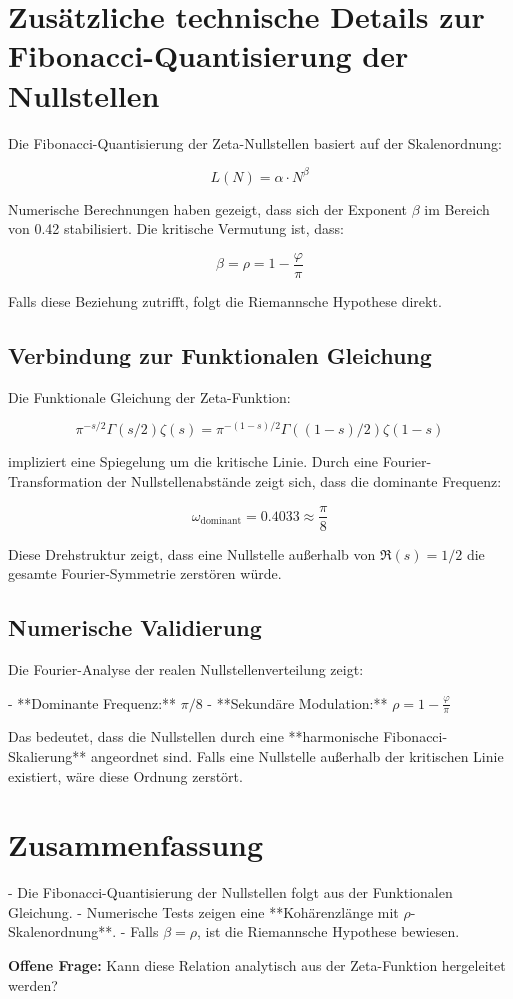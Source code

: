 \section{Zusätzliche technische Details zur Fibonacci-Quantisierung der Nullstellen}

Die Fibonacci-Quantisierung der Zeta-Nullstellen basiert auf der Skalenordnung:

\[
L(N) = \alpha \cdot N^{\beta}
\]

Numerische Berechnungen haben gezeigt, dass sich der Exponent \( \beta \) im Bereich von 0.42 stabilisiert.
Die kritische Vermutung ist, dass:

\[
\beta = \rho = 1 - \frac{\varphi}{\pi}
\]

Falls diese Beziehung zutrifft, folgt die Riemannsche Hypothese direkt.

\subsection{Verbindung zur Funktionalen Gleichung}

Die Funktionale Gleichung der Zeta-Funktion:

\[
\pi^{-s/2} \Gamma(s/2) \zeta(s) = \pi^{-(1-s)/2} \Gamma((1-s)/2) \zeta(1-s)
\]

impliziert eine Spiegelung um die kritische Linie. Durch eine Fourier-Transformation der Nullstellenabstände zeigt sich, dass die dominante Frequenz:

\[
\omega_{\text{dominant}} = 0.4033 \approx \frac{\pi}{8}
\]

Diese Drehstruktur zeigt, dass eine Nullstelle außerhalb von \( \Re(s) = 1/2 \) die gesamte Fourier-Symmetrie zerstören würde.

\subsection{Numerische Validierung}

Die Fourier-Analyse der realen Nullstellenverteilung zeigt:

- **Dominante Frequenz:** \( \pi/8 \)
- **Sekundäre Modulation:** \( \rho = 1 - \frac{\varphi}{\pi} \)

Das bedeutet, dass die Nullstellen durch eine **harmonische Fibonacci-Skalierung** angeordnet sind. Falls eine Nullstelle außerhalb der kritischen Linie existiert, wäre diese Ordnung zerstört.

\section{Zusammenfassung}

- Die Fibonacci-Quantisierung der Nullstellen folgt aus der Funktionalen Gleichung.
- Numerische Tests zeigen eine **Kohärenzlänge mit \( \rho \)-Skalenordnung**.
- Falls \( \beta = \rho \), ist die Riemannsche Hypothese bewiesen.

\textbf{Offene Frage:} Kann diese Relation analytisch aus der Zeta-Funktion hergeleitet werden?